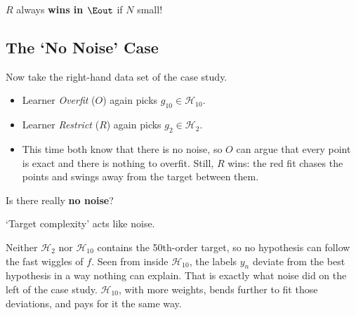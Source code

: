 \begin{moral}
    \(R\) always \textbf{wins in \(\Eout\)} if \(N\) small!
\end{moral}

\subsection{The `No Noise' Case}

\begin{center}
\end{center}

Now take the right-hand data set of the case study.
\begin{itemize}
    \item Learner \emph{Overfit} (\(O\)) again picks \(g_{10} \in
        \mathcal{H}_{10}\).
    \item Learner \emph{Restrict} (\(R\)) again picks \(g_2 \in
        \mathcal{H}_2\).
    \item This time both know that there is no noise, so \(O\) can argue that
        every point is exact and there is nothing to overfit. Still, \(R\)
        wins: the red fit chases the points and swings away from the target
        between them.
\end{itemize}

\begin{question}
    Is there really \textbf{no noise}?
\end{question}

\begin{moral}
    `Target complexity' acts like noise.
\end{moral}

Neither \(\mathcal{H}_2\) nor \(\mathcal{H}_{10}\) contains the 50th-order
target, so no hypothesis can follow the fast wiggles of \(f\). Seen from inside
\(\mathcal{H}_{10}\), the labels \(y_n\) deviate from the best hypothesis in a
way nothing can explain. That is exactly what noise did on the left of the
case study. \(\mathcal{H}_{10}\), with more weights, bends further to fit those
deviations, and pays for it the same way.

